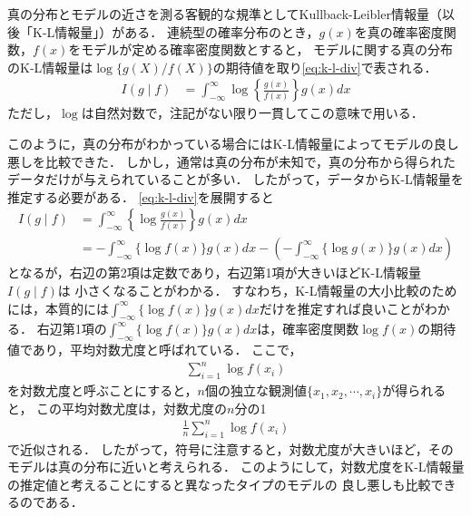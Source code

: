 真の分布とモデルの近さを測る客観的な規準としてKullback-Leibler情報量（以後「K-L情報量」）がある．
連続型の確率分布のとき，$g(x)$を真の確率密度関数，$f(x)$をモデルが定める確率密度関数とすると，
モデルに関する真の分布のK-L情報量は$\log\{g(X)/f(X)\}$の期待値を取り\eqref{eq:k-l-div}で表される．
\begin{align}
  \label{eq:k-l-div}
  I(g \mid f) &= \int^{\infty}_{-\infty}\log\left\{\frac{g(x)}{f(x)}\right\}g(x)dx
\end{align}
ただし，$\log$は自然対数で，注記がない限り一貫してこの意味で用いる．

このように，真の分布がわかっている場合にはK-L情報量によってモデルの良し悪しを比較できた．
しかし，通常は真の分布が未知で，真の分布から得られたデータだけが与えられていることが多い．
したがって，データからK-L情報量を推定する必要がある．
\eqref{eq:k-l-div}を展開すると
\begin{align*}
  I(g \mid f) &= \int^{\infty}_{-\infty}\left\{\log\frac{g(x)}{f(x)}\right\}g(x)dx\\\nonumber
              &= -\int^{\infty}_{-\infty}\{\log f(x)\}g(x)dx - 
                 \left(-\int^{\infty}_{-\infty}\{\log g(x)\}g(x)dx\right)
\end{align*}
となるが，右辺の第2項は定数であり，右辺第1項が大きいほどK-L情報量$I(g \mid f)$は
小さくなることがわかる．
すなわち，K-L情報量の大小比較のためには，本質的には$\int^{\infty}_{-\infty}\{\log f(x)\}g(x)dx$だけを推定すれば良いことがわかる．
右辺第1項の$\int^{\infty}_{-\infty}\{\log f(x)\}g(x)dx$は，確率密度関数$\log f(x)$の期待値であり，平均対数尤度と呼ばれている．
ここで，
\begin{align*}
  \sum_{i=1}^{n}\log f(x_i)
\end{align*}
を対数尤度と呼ぶことにすると，$n$個の独立な観測値$\{x_1, x_2, \cdots, x_i\}$が得られると，
この平均対数尤度は，対数尤度の$n$分の1
\begin{align*}
  \frac{1}{n}\sum_{i=1}^{n}\log f(x_i)
\end{align*}
で近似される．
したがって，符号に注意すると，対数尤度が大きいほど，そのモデルは真の分布に近いと考えられる．
このようにして，対数尤度をK-L情報量の推定値と考えることにすると異なったタイプのモデルの
良し悪しも比較できるのである．

